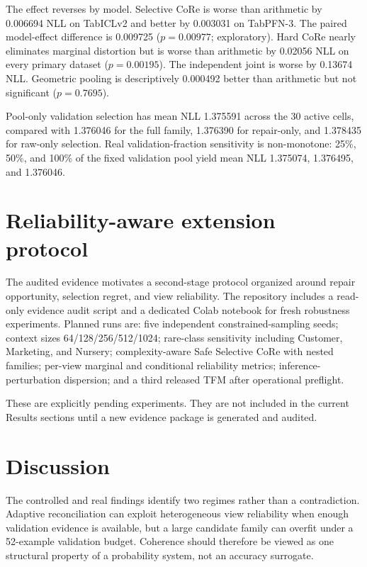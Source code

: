 \documentclass[pdflatex,sn-basic]{sn-jnl}
\theoremstyle{plain}
\begin{document}
The effect reverses by model. Selective CoRe is worse than arithmetic by 0.006694 NLL on TabICLv2 and better by 0.003031 on TabPFN-3. The paired model-effect difference is 0.009725 ($p=0.00977$; exploratory). Hard CoRe nearly eliminates marginal distortion but is worse than arithmetic by 0.02056 NLL on every primary dataset ($p=0.00195$). The independent joint is worse by 0.13674 NLL. Geometric pooling is descriptively 0.000492 better than arithmetic but not significant ($p=0.7695$).

Pool-only validation selection has mean NLL 1.375591 across the 30 active cells, compared with 1.376046 for the full family, 1.376390 for repair-only, and 1.378435 for raw-only selection. Real validation-fraction sensitivity is non-monotone: 25\%, 50\%, and 100\% of the fixed validation pool yield mean NLL 1.375074, 1.376495, and 1.376046.

\section{Reliability-aware extension protocol}\label{sec:extension}
The audited evidence motivates a second-stage protocol organized around repair opportunity, selection regret, and view reliability. The repository includes a read-only evidence audit script and a dedicated Colab notebook for fresh robustness experiments. Planned runs are: five independent constrained-sampling seeds; context sizes 64/128/256/512/1024; rare-class sensitivity including Customer, Marketing, and Nursery; complexity-aware Safe Selective CoRe with nested families; per-view marginal and conditional reliability metrics; inference-perturbation dispersion; and a third released TFM after operational preflight.

These are explicitly pending experiments. They are not included in the current Results sections until a new evidence package is generated and audited.

\section{Discussion}\label{sec:discussion}
The controlled and real findings identify two regimes rather than a contradiction. Adaptive reconciliation can exploit heterogeneous view reliability when enough validation evidence is available, but a large candidate family can overfit under a 52-example validation budget. Coherence should therefore be viewed as one structural property of a probability system, not an accuracy surrogate.
\end{document}
